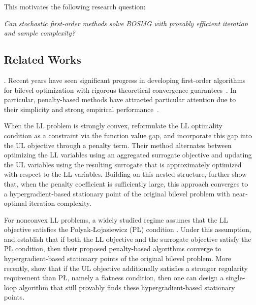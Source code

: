 \documentclass{article}
\theoremstyle{plain}
\theoremstyle{definition}
\theoremstyle{remark}
\begin{document}
\vspace{-1mm}
This motivates the following research question:
\vspace{-1mm}

\noindent
\begin{tcolorbox}[
    colback=white,
    colframe=black,
    boxrule=0.6pt,
    arc=2pt,
    left=5pt,
    right=5pt,
    top=3pt,
    bottom=3pt,
    width=\linewidth,
    boxsep=2pt,
    before skip=2pt,
    after skip=2pt
]
\centering
\emph{Can stochastic first-order methods solve BOSMG
with provably efficient iteration and sample complexity?}
\end{tcolorbox}
 
\vspace{-2mm}
\subsection{Related Works}
\vspace{-1mm}
. Recent years have seen significant progress in developing first-order algorithms for bilevel optimization with rigorous theoretical convergence guarantees~\citep{lu2024first,shen2023penalty, kwon2023penalty, huang2024optimal,liu2024moreau}. In particular, penalty-based methods have attracted particular attention due to their simplicity and strong empirical performance~\citep{shen2023penalty,kwon2023penalty,chen2025near,lu2025tsp}.

\vspace{-1mm}
When the LL problem is strongly convex, \citet{kwon2023fully} reformulate the LL optimality condition as a constraint via the function value gap, and incorporate this gap into the UL objective through a penalty term. Their method alternates between optimizing the LL variables using an aggregated surrogate objective and updating the UL variables using the resulting surrogate that is approximately optimized with respect to the LL variables. Building on this nested structure, \citet{chen2025near} further show that, when the penalty coefficient is sufficiently large, this approach converges to a hypergradient-based stationary point of the original bilevel problem with near-optimal iteration complexity.

\vspace{-1mm}
For nonconvex LL problems, a widely studied regime assumes that the LL objective satisfies the Polyak-{\L}ojasiewicz (P{\L}) condition \citep{lu2023slm,xiao2023alternating,huang2024optimal}. Under this assumption, \citet{kwon2023penalty} and \citet{chen2024finding} establish that if both the LL objective and the surrogate objective satisfy the P{\L} condition, then their proposed penalty-based algorithms converge to hypergradient-based stationary points of the original bilevel problem. More recently, \citet{jiang2025beyond} show that if the UL objective additionally satisfies a stronger regularity requirement than P{\L}, namely a flatness condition, then one can design a single-loop algorithm that still provably finds these hypergradient-based stationary points.
\end{document}
